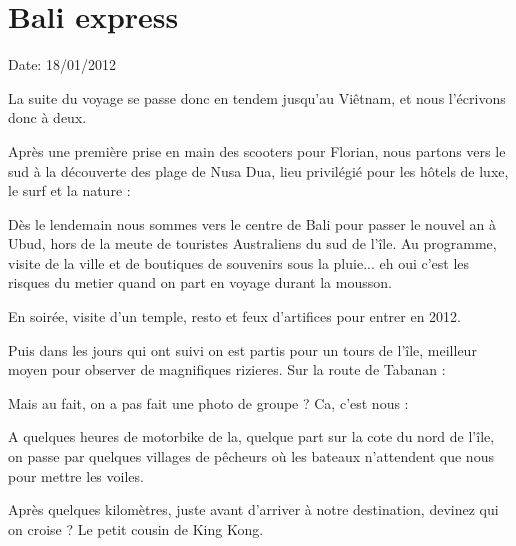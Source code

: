 \section{Bali express}

Date: 18/01/2012

\begin{multicols}{2}


La suite du voyage se passe donc en tendem jusqu'au Viêtnam, et nous l'écrivons donc à deux.

Après une première prise en main des scooters pour Florian, nous partons vers le sud à la découverte des plage de Nusa Dua, lieu privilégié pour les hôtels de luxe, le surf et la nature :


Dès le lendemain nous sommes vers le centre de Bali pour passer le nouvel an à Ubud, hors de la meute de touristes Australiens du sud de l'île. Au programme, visite de la ville et de boutiques de souvenirs sous la pluie... eh oui c'est les risques du metier quand on part en voyage durant la mousson.


En soirée, visite d'un temple, resto et feux d'artifices pour entrer en 2012.


Puis dans les jours qui ont suivi on est partis pour un tours de l'île, meilleur moyen pour observer de magnifiques rizieres. Sur la route de Tabanan :


Mais au fait, on a pas fait une photo de groupe ? Ca, c'est nous :


A quelques heures de motorbike de la, quelque part sur la cote du nord de l'île, on passe par quelques villages de pêcheurs où les bateaux n'attendent que nous pour mettre les voiles.


Après quelques kilomètres, juste avant d'arriver à notre destination, devinez qui on croise ? Le petit cousin de King Kong.


\end{multicols}
